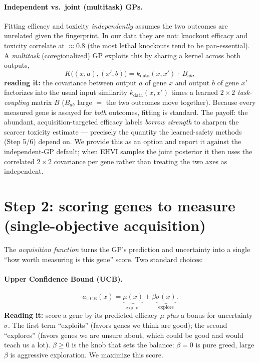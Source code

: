 \documentclass[11pt]{article}
\begin{document}
\paragraph{Independent vs.\ joint (multitask) GPs.} Fitting efficacy and toxicity
\emph{independently} assumes the two outcomes are unrelated given the fingerprint. In our
data they are not: knockout efficacy and toxicity correlate at $\approx 0.8$ (the most
lethal knockouts tend to be pan-essential). A \emph{multitask} (coregionalized) GP exploits
this by sharing a kernel across both outputs,
\begin{equation}
K\big((x,a),(x',b)\big)=k_{\text{data}}(x,x')\,\cdot\,B_{ab},
\end{equation}
\textbf{reading it:} the covariance between output $a$ of gene $x$ and output $b$ of gene
$x'$ factorizes into the usual input similarity $k_{\text{data}}(x,x')$ times a learned
$2\times2$ \emph{task-coupling} matrix $B$ ($B_{ab}$ large $=$ the two outcomes move
together). Because every measured gene is assayed for \emph{both} outcomes, fitting is
standard. The payoff: the abundant, acquisition-targeted efficacy labels \emph{borrow
strength} to sharpen the scarcer toxicity estimate --- precisely the quantity the
learned-safety methods (Step 5/6) depend on. We provide this as an option and report it
against the independent-GP default; when EHVI samples the joint posterior it then uses the
correlated $2\times2$ covariance per gene rather than treating the two axes as independent.

\section{Step 2: scoring genes to measure (single-objective acquisition)}

The \emph{acquisition function} turns the GP's prediction and uncertainty into a single
``how worth measuring is this gene'' score. Two standard choices:

\paragraph{Upper Confidence Bound (UCB).}
\begin{equation}
a_{\mathrm{UCB}}(x)=\underbrace{\mu(x)}_{\text{exploit}}+\beta\underbrace{\sigma(x)}_{\text{explore}} .
\end{equation}
\textbf{Reading it:} score a gene by its predicted efficacy $\mu$ \emph{plus} a bonus for
uncertainty $\sigma$. The first term ``exploits'' (favors genes we think are good); the
second ``explores'' (favors genes we are unsure about, which could be good and would teach
us a lot). $\beta\ge 0$ is the knob that sets the balance: $\beta=0$ is pure greed,
large $\beta$ is aggressive exploration. We maximize this score.
\end{document}
